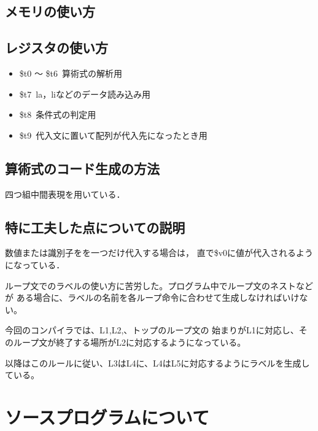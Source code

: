 \documentclass[11pt,a4j]{jarticle}
\begin{document}
\subsection{メモリの使い方}



\subsection{レジスタの使い方}

  \begin{itemize}
  \item \$t0 ～ \$t6~算術式の解析用
  \item \$t7~la，liなどのデータ読み込み用
  \item \$t8~条件式の判定用
  \item \$t9~代入文に置いて配列が代入先になったとき用
  \end{itemize}

\subsection{算術式のコード生成の方法}

四つ組中間表現を用いている．


\subsection{特に工夫した点についての説明}

数値または識別子をを一つだけ代入する場合は，
直で\$v0に値が代入されるようになっている．

\vspace{0.2in}

ループ文でのラベルの使い方に苦労した。プログラム中でループ文のネストなどが
ある場合に、ラベルの名前を各ループ命令に合わせて生成しなければいけない。

今回のコンパイラでは、L1,L2,、トップのループ文の
始まりがL1に対応し、そのループ文が終了する場所がL2に対応するようになっている。

以降はこのルールに従い、L3はL4に、L4はL5に対応するようにラベルを生成している。




\section{ソースプログラムについて}
\end{document}

